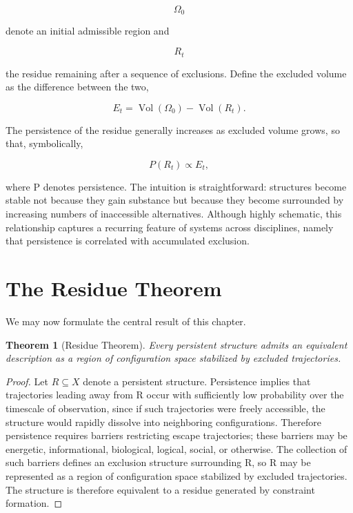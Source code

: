 \documentclass[11pt,oneside]{book}
\theoremstyle{plain}
\newtheorem{theorem}{Theorem}[chapter]
\theoremstyle{definition}
\theoremstyle{remark}
\DeclareMathOperator{\Vol}{Vol}
\begin{document}
\begin{equation}
\Omega_0
\end{equation}

denote an initial admissible region and

\begin{equation}
R_t
\end{equation}

the residue remaining after a sequence of exclusions. Define the excluded volume as the difference between the two,

\begin{equation}
E_t
=
\Vol(\Omega_0)
-
\Vol(R_t).
\end{equation}

The persistence of the residue generally increases as excluded volume grows, so that, symbolically,

\begin{equation}
P(R_t)
\propto
E_t,
\end{equation}

where P denotes persistence. The intuition is straightforward: structures become stable not because they gain substance but because they become surrounded by increasing numbers of inaccessible alternatives. Although highly schematic, this relationship captures a recurring feature of systems across disciplines, namely that persistence is correlated with accumulated exclusion.

\section{The Residue Theorem}

We may now formulate the central result of this chapter.

\begin{theorem}[Residue Theorem]
Every persistent structure admits an equivalent description as a region of configuration space stabilized by excluded trajectories.
\end{theorem}

\begin{proof}
Let \(R\subseteq X\) denote a persistent structure. Persistence implies that trajectories leading away from R occur with sufficiently low probability over the timescale of observation, since if such trajectories were freely accessible, the structure would rapidly dissolve into neighboring configurations. Therefore persistence requires barriers restricting escape trajectories; these barriers may be energetic, informational, biological, logical, social, or otherwise. The collection of such barriers defines an exclusion structure surrounding R, so R may be represented as a region of configuration space stabilized by excluded trajectories. The structure is therefore equivalent to a residue generated by constraint formation.
\end{proof}
\end{document}
